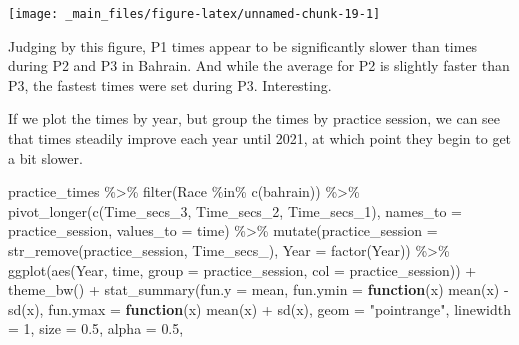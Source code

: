 \documentclass[
]{book}
\newenvironment{Shaded}{\begin{snugshade}}{\end{snugshade}}
\newcommand{\AttributeTok}[1]{\textcolor[rgb]{0.77,0.63,0.00}{#1}}
\newcommand{\ControlFlowTok}[1]{\textcolor[rgb]{0.13,0.29,0.53}{\textbf{#1}}}
\newcommand{\DecValTok}[1]{\textcolor[rgb]{0.00,0.00,0.81}{#1}}
\newcommand{\FloatTok}[1]{\textcolor[rgb]{0.00,0.00,0.81}{#1}}
\newcommand{\FunctionTok}[1]{\textcolor[rgb]{0.00,0.00,0.00}{#1}}
\newcommand{\NormalTok}[1]{#1}
\newcommand{\SpecialCharTok}[1]{\textcolor[rgb]{0.00,0.00,0.00}{#1}}
\newcommand{\StringTok}[1]{\textcolor[rgb]{0.31,0.60,0.02}{#1}}
\begin{document}
\begin{center}\texttt{[image: \_main\_files/figure-latex/unnamed-chunk-19-1]} \end{center}

Judging by this figure, P1 times appear to be significantly slower than times during P2 and P3 in Bahrain. And while the average for P2 is slightly faster than P3, the fastest times were set during P3. Interesting.

If we plot the times by year, but group the times by practice session, we can see that times steadily improve each year until 2021, at which point they begin to get a bit slower.

\begin{Shaded}
\begin{Highlighting}[]
\NormalTok{practice\_times }\SpecialCharTok{\%\textgreater{}\%}
  \FunctionTok{filter}\NormalTok{(Race }\SpecialCharTok{\%in\%} \FunctionTok{c}\NormalTok{(}\StringTok{\textquotesingle{}bahrain\textquotesingle{}}\NormalTok{)) }\SpecialCharTok{\%\textgreater{}\%} 
  \FunctionTok{pivot\_longer}\NormalTok{(}\FunctionTok{c}\NormalTok{(Time\_secs\_3, Time\_secs\_2, Time\_secs\_1), }\AttributeTok{names\_to =} \StringTok{\textquotesingle{}practice\_session\textquotesingle{}}\NormalTok{, }\AttributeTok{values\_to =} \StringTok{\textquotesingle{}time\textquotesingle{}}\NormalTok{) }\SpecialCharTok{\%\textgreater{}\%}
  \FunctionTok{mutate}\NormalTok{(}\AttributeTok{practice\_session =} \FunctionTok{str\_remove}\NormalTok{(practice\_session, }\StringTok{\textquotesingle{}Time\_secs\_\textquotesingle{}}\NormalTok{),}
         \AttributeTok{Year =} \FunctionTok{factor}\NormalTok{(Year)) }\SpecialCharTok{\%\textgreater{}\%}
  \FunctionTok{ggplot}\NormalTok{(}\FunctionTok{aes}\NormalTok{(Year, time, }
               \AttributeTok{group =}\NormalTok{ practice\_session, }\AttributeTok{col =}\NormalTok{ practice\_session)) }\SpecialCharTok{+}
  \FunctionTok{theme\_bw}\NormalTok{() }\SpecialCharTok{+}
  \FunctionTok{stat\_summary}\NormalTok{(}\AttributeTok{fun.y =}\NormalTok{ mean,}
               \AttributeTok{fun.ymin =} \ControlFlowTok{function}\NormalTok{(x) }\FunctionTok{mean}\NormalTok{(x) }\SpecialCharTok{{-}} \FunctionTok{sd}\NormalTok{(x), }
               \AttributeTok{fun.ymax =} \ControlFlowTok{function}\NormalTok{(x) }\FunctionTok{mean}\NormalTok{(x) }\SpecialCharTok{+} \FunctionTok{sd}\NormalTok{(x), }
               \AttributeTok{geom =} \StringTok{"pointrange"}\NormalTok{, }
               \AttributeTok{linewidth =} \DecValTok{1}\NormalTok{, }\AttributeTok{size =} \FloatTok{0.5}\NormalTok{, }\AttributeTok{alpha =} \FloatTok{0.5}\NormalTok{,}

\end{Highlighting}
\end{Shaded}
\end{document}
